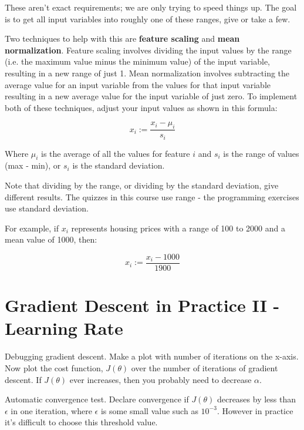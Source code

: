 \documentclass[10pt,a4paper,UTF8]{article}
\begin{document}
These aren't exact requirements; we are only trying to speed things up. The goal is to get all input variables into roughly one of these ranges, give or take a few.

Two techniques to help with this are \textbf{feature scaling} and \textbf{mean normalization}. Feature scaling involves dividing the input values by the range (i.e. the maximum value minus the minimum value) of the input variable, resulting in a new range of just 1. Mean normalization involves subtracting the average value for an input variable from the values for that input variable resulting in a new average value for the input variable of just zero. To implement both of these techniques, adjust your input values as shown in this formula:

\begin{equation}
\label{eq:4}
x_{i} := \frac{x_{i}-\mu_{i}}{s_{i}}
\end{equation}

Where \(\mu_{i}\) is the average of all the values for feature \(i\) and \(s_{i}\) is the range of values (max - min), or \(s_{i}\) is the standard deviation.

Note that dividing by the range, or dividing by the standard deviation, give different results. The quizzes in this course use range - the programming exercises use standard deviation.

For example, if \(x_{i}\) represents housing prices with a range of 100 to 2000 and a mean value of 1000, then:

\begin{equation}
\label{eq:5}
x_{i} := \frac{x_{i}-1000}{1900}
\end{equation}
\section{Gradient Descent in Practice II - Learning Rate}
\label{sec:orgdf1756f}


Debugging gradient descent. Make a plot with number of iterations on the x-axis. Now plot the cost function, \(J(\theta)\) over the number of iterations of gradient descent. If \(J(\theta)\) ever increases, then you probably need to decrease \(\alpha\).

Automatic convergence test. Declare convergence if \(J(\theta)\) decreases by less than \(\epsilon\) in one iteration, where \(\epsilon\) is some small value such as \(10^{-3}\). However in practice it's difficult to choose this threshold value.
\end{document}
